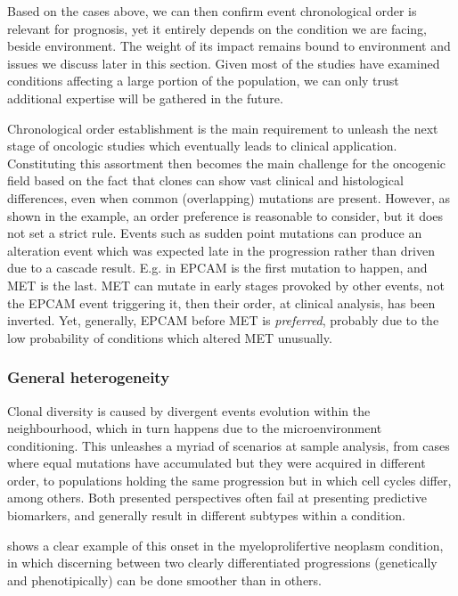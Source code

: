 Based on the cases above, we can then confirm event chronological order is relevant for prognosis, yet it entirely depends on the condition we are facing, beside environment. The weight of its impact remains bound to environment and issues we discuss later in this section. Given most of the studies have examined conditions affecting a large portion of the population, we can only trust additional expertise will be gathered in the future.

Chronological order establishment is the main requirement to unleash the next stage  of oncologic studies which eventually leads to clinical application. Constituting this assortment then becomes the main challenge for the oncogenic field \cite{Gerstung2011TheTumorigenesis} based on the fact that clones can show vast clinical and histological differences, even when common (overlapping) mutations are present. However, as shown in the \cite{Fearon1990ATumorigenesis} example, an order preference is reasonable to consider, but it does not set a strict rule. Events such as sudden point mutations can produce an alteration event which was expected late in the progression rather than driven due to a cascade result. E.g. in \cite{Ascolani2019ModelingMatter} EPCAM is the first mutation to happen, and MET is the last. MET can mutate in early stages provoked by other events, not the EPCAM event triggering it, then their order, at clinical analysis, has been inverted. Yet, generally, EPCAM before MET is \emph{preferred}, probably due to the low probability of conditions which altered MET unusually.
\\

\subsubsection{General heterogeneity}
Clonal diversity is caused by divergent events evolution within the neighbourhood, which in turn happens due to the microenvironment conditioning. This unleashes a myriad of scenarios at sample analysis, from cases where equal mutations have accumulated but they were acquired in different order, to populations holding the same progression but in which cell cycles differ, among others. Both presented perspectives often fail at presenting predictive biomarkers, and generally result in different subtypes within a condition. 

\cite{Herbet2012AcquisitionPhenotypes} shows a clear example of this onset in the myeloprolifertive neoplasm condition, in which discerning between two clearly differentiated progressions (genetically and phenotipically) can be done smoother than in others.
\\

